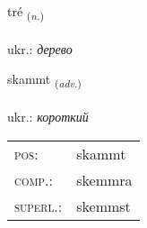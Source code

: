 \documentclass[frontgrid, backgrid]{flacards}\usepackage[]{graphicx}\usepackage[]{xcolor}
\begin{document}
\renewcommand{\flhead}{\vskip5pt \fboxsep=0pt {\small\bfseries\footnotesize Nafnorð | іменник}}
\renewcommand{\fcfoot}{\vskip5pt \fboxsep=0pt \hspace{2pt}{\small\bfseries\footnotesize 2K}}

\renewcommand{\blhead}{\vskip5pt {\small\bfseries\footnotesize Nafnorð | іменник }}
\renewcommand{\bcfoot}{\vskip5pt \hspace{2pt}{\small\bfseries\footnotesize 2K}}


{tré \small{\textsubscript{(\textit{n.})}} \\[1ex] %
\textphonetic{[tʰrjɛː]} \\
ukr.: \emph{дерево} \\  [2ex]
\renewcommand*{\arraystretch}{0.8}
}

\renewcommand{\flhead}{\vskip5pt \fboxsep=0pt {\small\bfseries\footnotesize Atviksorð | прислівник}}
\renewcommand{\fcfoot}{\vskip5pt \fboxsep=0pt \hspace{2pt}{\small\bfseries\footnotesize 2K}}

\renewcommand{\blhead}{\vskip5pt {\small\bfseries\footnotesize Atviksorð | прислівник }}
\renewcommand{\bcfoot}{\vskip5pt \hspace{2pt}{\small\bfseries\footnotesize 2K}}


{skammt \small{\textsubscript{(\textit{adv.})}} \\[1ex] %
\textphonetic{[skam̥t]} \\
ukr.: \emph{короткий} \\  [2ex]
\renewcommand*{\arraystretch}{0.8}
\begin{tabular}{ll}
\textsc{pos}: & skammt \\ 
\textsc{comp.}: & skemmra \\ 
\textsc{superl.}: & skemmst \\
\end{tabular}
}
\end{document}
